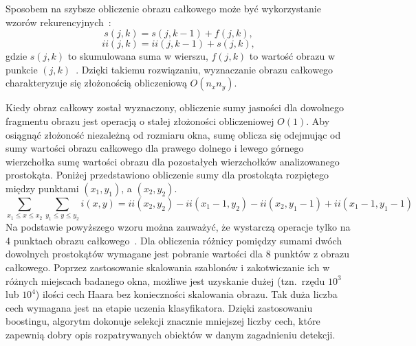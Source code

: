 Sposobem na szybsze obliczenie obrazu całkowego może być wykorzystanie wzorów rekurencyjnych~\cite{990517,10.1145/800031.808600}:
\begin{equation}
    \label{eq:integral_image_induction}
    s(j,k)=s(j, k-1)+f(j,k),
\end{equation}
\begin{equation}
    \label{eq:integral_image_induction2}
    ii(j,k)=ii(j,k-1)+s(j,k),
\end{equation}
gdzie $s(j,k)$ to skumulowana suma w wierszu, $f(j,k)$ to wartość obrazu w punkcie $(j,k)$~\cite{990517}.
Dzięki takiemu rozwiązaniu, wyznaczanie obrazu całkowego charakteryzuje się złożonością obliczeniową $O(n_x n_y)$.

Kiedy obraz całkowy został wyznaczony, obliczenie sumy jasności dla dowolnego fragmentu obrazu jest operacją o stałej złożoności obliczeniowej $O(1)$.
Aby osiągnąć złożoność niezależną od rozmiaru okna, sumę oblicza się odejmując od sumy wartości obrazu całkowego dla prawego dolnego i lewego górnego wierzchołka sumę wartości obrazu dla pozostałych wierzchołków analizowanego prostokąta.
Poniżej przedstawiono obliczenie sumy dla prostokąta rozpiętego między punktami $(x_1, y_1)$, a $(x_2, y_2)$.
\begin{equation}
    \label{eq:integral_image_x_y}
    \sum_{x_1\leq x \leq x_2} \sum_{y_1\leq y \leq y_2} i(x,y) = ii(x_2, y_2) - ii(x_1 - 1, y_2) - ii(x_2, y_1 - 1) + ii(x_1 - 1, y_1 - 1)
\end{equation}
Na podstawie powyższego wzoru można zauważyć, że wystarczą operacje tylko na 4 punktach obrazu całkowego~\cite{szybka_detekcja_klesk}.
Dla obliczenia różnicy pomiędzy sumami dwóch dowolnych prostokątów wymagane jest pobranie wartości dla 8 punktów z obrazu całkowego.
Poprzez zastosowanie skalowania szablonów i zakotwiczanie ich w różnych miejscach badanego okna, możliwe jest uzyskanie dużej (tzn.\ rzędu $10^3$ lub $10^4$) ilości cech Haara bez konieczności skalowania obrazu.
Tak duża liczba cech wymagana jest na etapie uczenia klasyfikatora.
Dzięki zastosowaniu boostingu, algorytm dokonuje selekcji znacznie mniejszej liczby cech, które zapewnią dobry opis rozpatrywanych obiektów w danym zagadnieniu detekcji.

